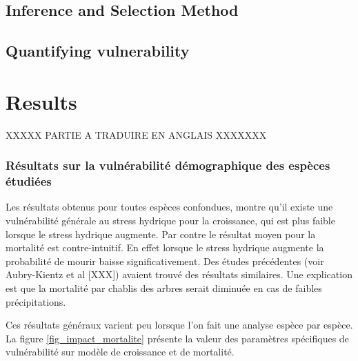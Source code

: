 \documentclass[review]{elsarticle}
\begin{document}

\subsection{Inference and Selection Method}

\subsection{Quantifying vulnerability}




%
%
%
%
%
%
%
%
%
%
%
%
%




\section{Results}\label{section_trois}

\begin{center}
    XXXXX PARTIE A TRADUIRE EN ANGLAIS XXXXXXX
\end{center}

\subsubsection{Résultats sur la vulnérabilité démographique des espèces étudiées}

\noindent Les résultats obtenus pour toutes espèces confondues, montre qu'il existe une vulnérabilité générale au stress hydrique pour la croissance, qui est plus faible lorsque le stress hydrique augmente. Par contre le résultat moyen pour la mortalité est contre-intuitif. En effet lorsque le stress hydrique augmente la probabilité de mourir baisse significativement. Des études précédentes (voir Aubry-Kientz et al [XXX]) avaient trouvé des résultats similaires. Une explication est que la mortalité par chablis des arbres serait diminuée en cas de faibles précipitations.


\noindent Ces résultats généraux varient peu lorsque l'on fait une analyse espèce par espèce. La figure \ref{fig_impact_mortalite} présente la valeur des paramètres spécifiques de vulnérabilité sur modèle de croissance et de mortalité. 
\end{document}
